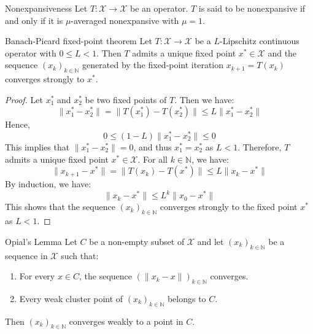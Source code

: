 \begin{proposition}{Nonexpansiveness}
    Let $T: \mathcal{X} \to \mathcal{X}$ be an operator. $T$ is said to be nonexpansive if and only if it is $\mu$-averaged nonexpansive with $\mu = 1$.
\end{proposition}

\begin{theorem}{Banach-Picard fixed-point theorem \cite{bauschke2017convex}}
    Let $T: \mathcal{X} \to \mathcal{X}$ be a $L$-Lipschitz continuous operator with $0 \leq L < 1$. Then $T$ admits a unique fixed point $x^* \in \mathcal{X}$ and the sequence $(x_k)_{k \in \mathbb{N}}$ generated by the fixed-point iteration $x_{k+1} = T(x_k)$ converges strongly to $x^*$.
\end{theorem}

\begin{proof}
    Let $x_1^*$ and $x_2^*$ be two fixed points of $T$. Then we have:
    \begin{equation*}
        \|x_1^* - x_2^*\| = \|T(x_1^*) - T(x_2^*)\| \leq L \|x_1^* - x_2^*\|
    \end{equation*}
    Hence,
    \begin{equation*}
        0 \leq (1 - L) \|x_1^* - x_2^*\| \leq 0
    \end{equation*}
    This implies that $\|x_1^* - x_2^*\| = 0$, and thus $x_1^* = x_2^*$ as $L < 1$. Therefore, $T$ admits a unique fixed point $x^* \in \mathcal{X}$.
    For all $k \in \mathbb{N}$, we have:
    \begin{equation*}
        \|x_{k+1} - x^*\| = \|T(x_k) - T(x^*)\| \leq L \|x_k - x^*\|
    \end{equation*}
    By induction, we have:
    \begin{equation*}
        \|x_{k} - x^*\| \leq L^{k} \|x_0 - x^*\|
    \end{equation*}
    This shows that the sequence $(x_k)_{k \in \mathbb{N}}$ converges strongly to the fixed point $x^*$ as $L < 1$.
\end{proof}

\begin{lemma}{Opial's Lemma \cite{Opial1967Weak}}
    Let $C$ be a non-empty subset of $\mathcal{X}$ and let $(x_k)_{k \in \mathbb{N}}$ be a sequence in $\mathcal{X}$ such that:
    \begin{enumerate}
        \item For every $x \in C$, the sequence $(\|x_k - x\|)_{k \in \mathbb{N}}$ converges.
        \item Every weak cluster point of $(x_k)_{k \in \mathbb{N}}$ belongs to $C$.
    \end{enumerate}
    Then $(x_k)_{k \in \mathbb{N}}$ converges weakly to a point in $C$.
\end{lemma}

